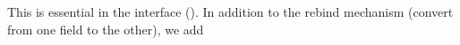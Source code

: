 %
\begin{comment}
		\monitem{Accessing Elements.}
		The function \texttt{setEntry} can be
		used to populate the matrix (from some \texttt{init()} until a
		\texttt{finish()} is emitted).  The function \texttt{setEntry}
		can be costly (for some sparse formats for instance)
%
		Other functions such as {\tt refEntry} (that retrieves a
		writable reference to an entry) may be difficult to implement
		or inefficient (compressed fields, sparse matrices);
		\texttt{getEntry} may be specialized.
		Accessing (read or write) elements, rows or columns through
		iterators, although handy, is not required because it can be
		tricky to implement (compressed fields, hybrid or
		recursive formats). Traits on matrices where efficient iterators
		are available allow for their selections in some algorithms.
\end{comment}
		\begin{comment}
		(\danger We cannot have {\tt const} iterators for all formats
		(see hybrid), walking through a matrix in unspecified order can
		be problematic, for instance, in an hom when a zero may
		alter/change the representation. I don't understand hom more
		than I understand init/rebind by the way, and I won't
		understand it until the morphism is given/chooseable/enforced.
		Rebind is really hom, so why is it in the interface anyway?
		This is the same with getEntry. We don't require it because we
		have a solution. Also, if apply is to be implemented via a
		domain or {\tt mul}, we could stress it is in the interface for
		convenience when writing code only. End of \danger)
		\end{comment}
%
		This is essential in the \applin interface ().
%
		In addition to the rebind mechanism (convert from one field to the other), we add
